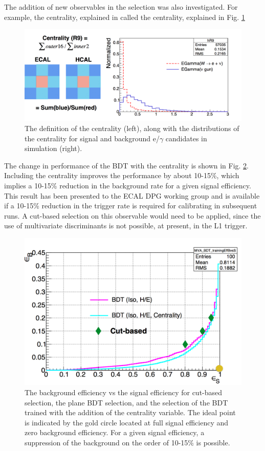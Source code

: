 The addition of new observables in the selection was also investigated. For example, the centrality, explained in  called the centrality, explained in Fig. \ref{fig:centrality}
\begin{figure}[h]
\centering
  \includegraphics[width=0.95\linewidth]{figures/CMS/EcalCentrality.png}
\caption{The definition of the centrality (left), along with the distributions of the centrality for signal and background e/$\gamma$ candidates in simulation (right). }
\label{fig:centrality}
\end{figure}
The change in performance of the BDT with the centrality is shown in Fig. \ref{fig:ECALMva3}. Including the centrality improves the performance by about 10-15\%, which implies a 10-15\% reduction in the background rate  for a given signal efficiency. This result has been presented to the ECAL DPG working group and is available if a 10-15\% reduction in the trigger rate is required for calibrating in subsequent runs. A cut-based selection on this observable would need to be applied, since the use of multivariate discriminants is not possible, at present, in the L1 trigger.
\begin{figure}[h]
\centering
  \includegraphics[width=0.79\linewidth]{figures/CMS/ECALMva3.png}
\caption{The background efficiency vs the signal efficiency for cut-based selection, the plane BDT selection, and the selection of the BDT trained with the addition of the centrality variable. The ideal point is indicated by the gold circle located at full signal efficiency and zero background efficiency. For a given signal efficiency, a suppression of the background on the order of 10-15\% is possible. }
\label{fig:ECALMva3}
\end{figure}


